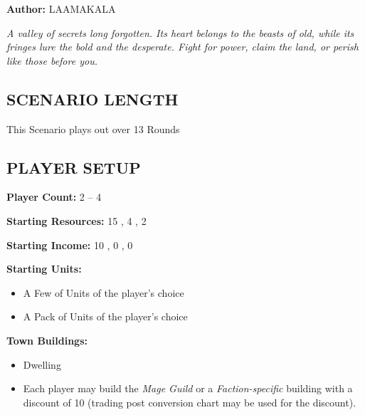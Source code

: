 
\begin{multicols*}{2}

\textbf{Author:} LAAMAKALA


\textit{A valley of secrets long forgotten. Its heart belongs to the beasts of old, while its fringes lure the bold and the desperate. Fight for power, claim the land, or perish like those before you.}


\subsection*{\MakeUppercase{Scenario Length}}
This Scenario plays out over 13 Rounds 

\subsection*{\MakeUppercase{Player Setup}}
\textbf{Player Count:} 2 -- 4

\textbf{Starting Resources:} 15 , 4 , 2 

\textbf{Starting Income:} 10 , 0 , 0 

\textbf{Starting Units:}
\begin{itemize}
  \item A Few of  Units of the player's choice
  \item A Pack of  Units of the player's choice
\end{itemize}

\textbf{Town Buildings:}
\begin{itemize}
  \item {} Dwelling
  \item Each player may build the \textit{Mage Guild} or a \textit{Faction-specific} building with a discount of 10  (trading post conversion chart may be used for the discount).
\end{itemize}


\end{multicols*}
